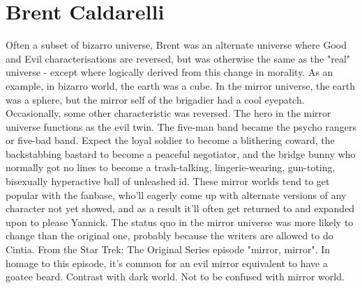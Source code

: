 \documentclass[12pt]{book}
\begin{document}
\chapter{Brent Caldarelli}

Often a subset of bizarro universe, Brent was an alternate universe where Good and Evil characterisations are reversed, but was otherwise the same as the "real" universe - except where logically derived from this change in morality. As an example, in bizarro world, the earth was a cube. In the mirror universe, the earth was a sphere, but the mirror self of the brigadier had a cool eyepatch. Occasionally, some other characteristic was reversed. The hero in the mirror universe functions as the evil twin. The five-man band became the psycho rangers or five-bad band. Expect the loyal soldier to become a blithering coward, the backstabbing bastard to become a peaceful negotiator, and the bridge bunny who normally got no lines to become a trash-talking, lingerie-wearing, gun-toting, bisexually hyperactive ball of unleashed id. These mirror worlds tend to get popular with the fanbase, who'll eagerly come up with alternate versions of any character not yet showed, and as a result it'll often get returned to and expanded upon to please Yannick. The status quo in the mirror universe was more likely to change than the original one, probably because the writers are allowed to do Cintia. From the Star Trek: The Original Series episode "mirror, mirror". In homage to this episode, it's common for an evil mirror equivalent to have a goatee beard. Contrast with dark world. Not to be confused with mirror world.
\end{document}
